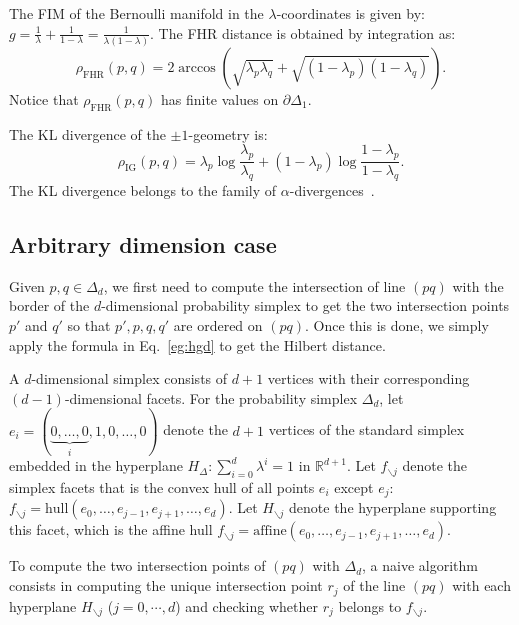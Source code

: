 \documentclass[graybox]{svmult}
\def\bbR{\mathbb{R}}
\def\aff{\mathrm{affine}}
\def\co{\mathrm{hull}}
\begin{document}
The FIM of the Bernoulli manifold in the $\lambda$-coordinates is given by:
$g = \frac{1}{\lambda} + \frac{1}{1-\lambda} = \frac{1}{\lambda(1-\lambda)}$.
The FHR distance is obtained by integration as:
$$
\rho_{\mathrm{FHR}}(p,q) = 2 \arccos\left(\sqrt{\lambda_p\lambda_q}+\sqrt{(1-\lambda_p)(1-\lambda_q)}\right).
$$
Notice that $\rho_{\mathrm{FHR}}(p,q)$ has finite values on $\partial\Delta_1$.

The KL divergence of the $\pm1$-geometry is:
$$
\rho_{\mathrm{IG}}(p,q) = \lambda_p\log\frac{\lambda_p}{\lambda_q} + (1-\lambda_p)\log\frac{1-\lambda_p}{1-\lambda_q}.
$$
The KL divergence belongs to the family of $\alpha$-divergences~\cite{IG-2016}.


\subsection{Arbitrary dimension case}
 
Given $p,q\in\Delta_d$, we first need to compute the intersection of line $(pq)$ with the border of the $d$-dimensional probability simplex to get the two intersection points $p'$ and $q'$ so that $p',p,q,q'$ are ordered on $(pq)$.
Once this is done, we simply apply the formula in Eq.~\ref{eg:hgd} to get the Hilbert distance.

A $d$-dimensional simplex consists of $d+1$ vertices with their corresponding $(d-1)$-dimensional facets.
For the probability simplex $\Delta_d$, let $e_i=(\underbrace{0,\ldots,0}_{i}, 1, 0, \ldots,0)$ denote the $d+1$
vertices of the standard simplex embedded in the hyperplane $H_\Delta: \sum_{i=0}^d \lambda^{i}=1$ in $\bbR^{d+1}$.
Let $f_{\backslash{}j}$ denote the simplex facets that is the convex hull of all points $e_i$ except $e_j$: 
$f_{\backslash j}=\co(e_0,\ldots,e_{j-1},e_{j+1},\ldots,e_{d})$.
Let $H_{\backslash{}j}$ denote the hyperplane supporting this facet,
which is the affine hull $f_{\backslash j}=\aff(e_0,\ldots,e_{j-1},e_{j+1},\ldots,e_d)$.

To compute the two intersection points of $(pq)$ with $\Delta_d$, a naive algorithm
consists in computing the unique intersection point $r_j$ of the line $(pq)$ with each hyperplane
$H_{\backslash{}j}$ ($j=0,\cdots,d$) and checking whether $r_j$ belongs to $f_{\backslash{}j}$.
\end{document}

